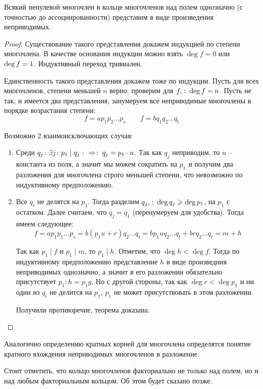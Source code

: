 \begin{theorem}
  Всякий ненулевой многочлен в кольце многочленов над полем однозначно (с точностью до ассоциированности) представим в виде произведения неприводимых.
\end{theorem}
\begin{proof}
  Существование такого представления докажем индукцией по степени многочлена. В качестве основания индукции можно взять $\deg f=0$ или $\deg f\bw=1$. Индуктивный переход тривиален.
  
  Единственность такого представления докажем тоже по индукции. Пусть для всех многочленов, степени меньшей $n$ верно; проверим для $f,\spc\deg f\bw=n$. Пусть не так, и имеется два представления, занумеруем все неприводимые многочлены в порядке возрастания степени:
  $$f=ap_1p_2\dots p_s\qquad f=bq_1q_2\dots q_t$$
  
  Возможно 2 взаимоисключающих случая:
  \begin{enumerate}
    \item Среди $q_j\colon\exists j\colon p_1\mid q_j\mathbin{\colon\Rightarrow \colon} q_j=p_1\cdot u$. Так как $q_j$ неприводим, то $u$ -- константа из поля, а значит мы можем сократить на $p_1$ и получим два разложения для многочлена строго меньшей степени, что невозможно по индуктивному предположению.
    \item Все $q_i$ не делятся на $p_1$. Тогда разделим $q_j,\colon\deg q_j\geqslant\deg p_1$, на $p_1$ с остатком. Далее считаем, что $q_j = q_1$ (перенумеруем для удобства). Тогда имеем следующее:
    $$f=ap_1p_1\dots p_s=b(p_1u+r)q_2\dots q_t=bp_1uq_2\dots q_t+brq_2\dots q_t=m+h$$
    
    Так как $p_1\mid f$ и $p_1\mid m$, то $p_1\mid h$. Отметим, что $\deg h<\deg f$. Тогда по индуктивному предположению представление $h$ в виде произведния неприводимых однозначно, а значит в его разложении обязательно присутствует $p_1\colon h=p_1g$. Но с другой стороны, так как $\deg r<\deg p_1$ и ни один из $q_i$ не делится на $p_1$, $p_1$ не может присутствовать в этом разложении.
    
    Получили противоречие, теорема доказана.
  \end{enumerate}
\end{proof}

Аналогично определению кратных корней для многочлена определятся понятие кратного вхождения неприводимых многочленов в разложение.

Стоит отметить, что кольцо многочленов факториально не только над полем, но и над любым факториальным кольцом. Об этом будет сказано позже.


